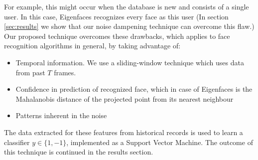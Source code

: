 \documentclass[%
        final,
        notitlepage,
        narroweqnarray,
        inline,
        ]{ieee}
\begin{document}
For example, this might occur when the database is new and consists of a single user. 
In this case, Eigenfaces recognizes every face as this user 
(In section \ref{sec:results} we show that our noise dampening technique can overcome this flaw.)
Our proposed technique overcomes these drawbacks, which applies to face recognition algorithms in general, by taking advantage of:
\begin{itemize}
	\item Temporal information. We use a sliding-window technique which uses data from past $T$ frames.
	\item Confidence in prediction of recognized face, which in case of Eigenfaces is the Mahalanobis distance of the projected point from its nearest neighbour
	\item Patterns inherent in the noise
\end{itemize}
The data extracted for these features from historical records is used to learn a classifier $y \in \{1,-1\}$, implemented as a Support Vector Machine. The outcome of this technique is continued in the results section.
\end{document}
